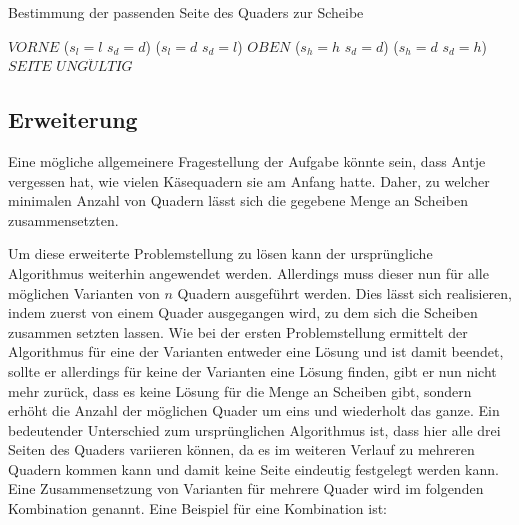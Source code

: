 \documentclass[a4paper,10pt,ngerman]{scrartcl}
\begin{document}
    \begin{algorithm}[H]
        \caption{Bestimmung der passenden Seite des Quaders zur Scheibe}
        \label{alg:cheese2}
        \begin{algorithmic}
                    \State \Return $VORNE$
                \ElsIf
                        {($s_{l} = l$ \land $s_{d} = d$) \lor ($s_{l} = d$ \land $s_{d} = l$)}
                    \State \Return $OBEN$
                \ElsIf
                        {($s_{h} = h$ \land $s_{d} = d$) \lor ($s_{h} = d$ \land $s_{d} = h$)}
                    \State \Return $SEITE$
                \Else
                    \State \Return $UNG\ddot ULTIG$
                \EndIf
            \EndFunction
        \end{algorithmic}
    \end{algorithm}

    \subsection{Erweiterung}\label{subsec:erweiterung_losungsidee}

    Eine mögliche allgemeinere Fragestellung der Aufgabe könnte sein, dass Antje vergessen hat,
    wie vielen Käsequadern sie am Anfang hatte.
    Daher, zu welcher minimalen Anzahl von Quadern lässt sich die gegebene Menge an Scheiben zusammensetzten.

    Um diese erweiterte Problemstellung zu lösen kann der ursprüngliche Algorithmus weiterhin angewendet werden.
    Allerdings muss dieser nun für alle möglichen Varianten von $n$ Quadern ausgeführt werden.
    Dies lässt sich realisieren, indem zuerst von einem Quader ausgegangen wird, zu dem sich die Scheiben zusammen setzten lassen.
    Wie bei der ersten Problemstellung ermittelt der Algorithmus für eine der Varianten entweder eine Lösung und ist damit beendet,
    sollte er allerdings für keine der Varianten eine Lösung finden, gibt er nun nicht mehr zurück, dass es keine Lösung für die Menge an Scheiben gibt,
    sondern erhöht die Anzahl der möglichen Quader um eins und wiederholt das ganze.
    Ein bedeutender Unterschied zum ursprünglichen Algorithmus ist, dass hier alle drei Seiten des Quaders variieren können,
    da es im weiteren Verlauf zu mehreren Quadern kommen kann und damit keine Seite eindeutig festgelegt werden kann.
    Eine Zusammensetzung von Varianten für mehrere Quader wird im folgenden Kombination genannt.
    Eine Beispiel für eine Kombination ist:
\end{document}

